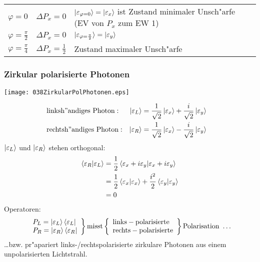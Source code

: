 \documentclass[a4paper]{scrartcl}
\begin{document}
{\begin{tabular}{l l p{300pt}}
$\varphi=0$ &  $\Delta P_x = 0$ &  $\ket { \varepsilon_{\varphi = 0}} = \ket { \varepsilon_x }$ ist Zustand minimaler Unsch"arfe (EV von $P_x$ zum EW 1) \\
$\varphi = \frac \pi 2$ & $\Delta P_x = 0$ & $\ket {\varepsilon_{\varphi = \frac \pi 2}} = \ket{ \varepsilon_y}$ \\
$\varphi = \frac \pi 4$ & $\Delta P_x = \frac12$ & Zustand maximaler Unsch"arfe
\end{tabular}

\subsubsection*{Zirkular polarisierte Photonen}

\begin{center}
\texttt{[image: 038ZirkularPolPhotonen.eps]}\end{center}

\begin{align}
& \mathrm{linksh"andiges \ Photon:} &  \ket {\varepsilon_L } & = \frac1{\sqrt2} \ket{\varepsilon_x} + \frac i {\sqrt2} \ket{\varepsilon_y} &  &\\
& \mathrm{rechtsh"andiges \ Photon:} & \ket {\varepsilon_R } & = \frac1{\sqrt2} \ket{\varepsilon_x} - \frac i {\sqrt2} \ket{\varepsilon_y} 
\end{align}
$\ket {\varepsilon_L}$ und $\ket{\varepsilon_R}$ stehen orthogonal:
\begin{align}
\begin{split}
\braket{ \varepsilon_R | \varepsilon_L} & = \frac12 \braket{ \varepsilon_x + i \varepsilon_y | \varepsilon_x + i \varepsilon_y } \\
& = \frac12 \braket{ \varepsilon_x | \varepsilon_x } + \frac{i^2}2 \braket{\varepsilon_y | \varepsilon_y} \\
& = 0 
\end{split}
\end{align}
Operatoren: 
\begin{align}
\left.
\begin{array}{l}
P_L = \ket{ \varepsilon_L} \bra{ \varepsilon_L} \\
P_R = \ket{ \varepsilon_R} \bra {\varepsilon_R} 
\end{array}
\right\}
\mathrm{ misst } \left\{
\begin{array}{l}
\mathrm{links-polarisierte}\\
\mathrm{rechts-polarisierte}
\end{array}
\right\} 
\mathrm{ Polarisation \ \ldots}
\end{align}
\ldots bzw. pr"apariert links-/rechtspolarisierte zirkulare Photonen aus einem unpolarisierten Lichtstrahl.

}
\end{document}
